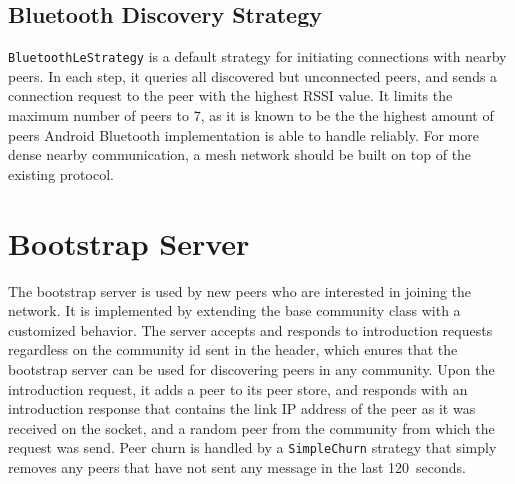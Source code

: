 \subsection{Bluetooth Discovery Strategy}

\texttt{BluetoothLeStrategy} is a default strategy for initiating connections with nearby peers. In each step, it queries all discovered but unconnected peers, and sends a connection request to the peer with the highest RSSI value. It limits the maximum number of peers to 7, as it is known to be the the highest amount of peers Android Bluetooth implementation is able to handle reliably. For more dense nearby communication, a mesh network should be built on top of the existing protocol.









\section{Bootstrap Server}

The bootstrap server is used by new peers who are interested in joining the network. It is implemented by extending the base community class with a customized behavior. The server accepts and responds to introduction requests regardless on the community id sent in the header, which enures that the bootstrap server can be used for discovering peers in any community. Upon the introduction request, it adds a peer to its peer store, and responds with an introduction response that contains the link IP address of the peer as it was received on the socket, and a random peer from the community from which the request was send. Peer churn is handled by a \texttt{SimpleChurn} strategy that simply removes any peers that have not sent any message in the last 120~seconds.

